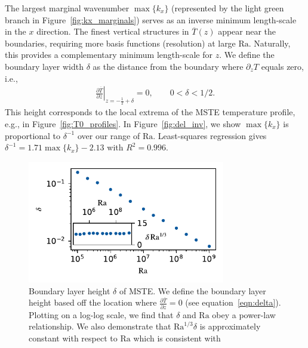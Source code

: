 \documentclass[reprint,amsmath,amssymb,aps,nofootinbib]{revtex4-1}
\newcommand\Ra{\mathrm{Ra}}
\renewcommand{\vec}[1]{\boldsymbol{#1}}
\begin{document}
The largest marginal wavenumber $\max \{ k_x \}$ (represented by the light green branch in Figure~\ref{fig:kx_marginals}) serves as an inverse minimum length-scale in the $x$ direction.
The finest vertical structures in $\overline{T}(z)$ appear near the boundaries, requiring more basis functions (resolution) at large $\Ra$.
Naturally, this provides a complementary minimum length-scale for $z$.
We define the boundary layer width $\delta$ as the distance from the boundary where $\partial_z T$ equals zero, i.e.,
\begin{align}\label{eqn:delta}
    \left.\frac{\partial \overline{T}}{\partial z}\right|_{z=-\frac{1}{2}+\delta} = 0, \qquad 0 < \delta < 1/2.
\end{align}
This height corresponds to the local extrema of the MSTE temperature profile, e.g., in Figure~\ref{fig:T0_profiles}.
In Figure~\ref{fig:del_inv}, we show $\max \{ k_x\}$ is proportional to $\delta^{-1}$ over our range of $\Ra$.
Least-squares regression gives $\delta^{-1} = 1.71 \max \{ k_x \} - 2.13$ with $R^2 = 0.996$.

\begin{figure}
    \centering
    \includegraphics[width=3.4in]{del_ra.pdf}
    \caption{Boundary layer height $\delta$ of MSTE. 
    We define the boundary layer height based off the location where $\frac{\partial \overline{T}}{\partial z} = 0$ (see equation~\ref{eqn:delta}). 
    Plotting on a log-log scale, we find that $\delta$ and $\Ra$ obey a power-law relationship. We also demonstrate that $\Ra^{1/3}\delta$ is approximately constant with respect to $\Ra$ which is consistent with \cite{Malkus_1954}}
    \label{fig:bl_ra}
\end{figure}
\end{document}
